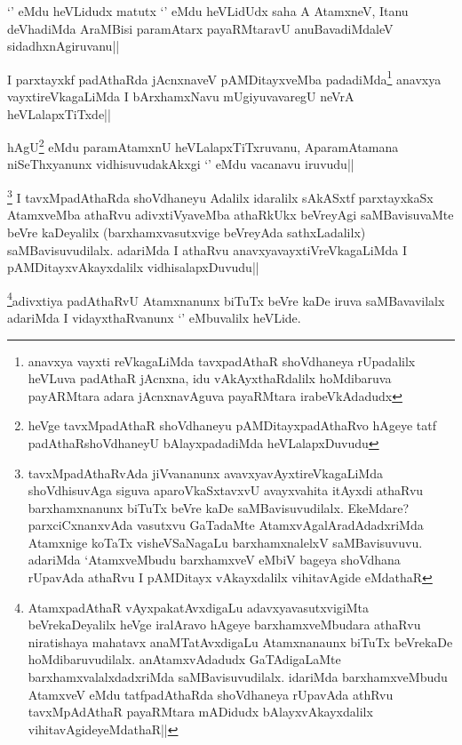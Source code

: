 
\begin{artha}
`\stext ' eMdu heVLidudx matutx `\stext ' eMdu heVLidUdx saha A AtamxneV, Itanu deVhadiMda AraMBisi paramAtarx payaRMtaravU anuBavadiMdaleV sidadhxnAgiruvanu||
\end{artha}


\begin{artha}
I parxtayxkf padAthaRda jAcnxnaveV pAMDitayxveMba padadiMda\footnote[1]{anavxya vayxti reVkagaLiMda tavxpadAthaR shoVdhaneya rUpadalilx heVLuva padAthaR jAcnxna, idu vAkAyxthaRdalilx hoMdibaruva payARMtara adara jAcnxnavAguva payaRMtara irabeVkAdadudx} anavxya vayxtireVkagaLiMda I bArxhamxNavu mUgiyuvavaregU neVrA heVLalapxTiTxde||
\end{artha}

\begin{artha}
hAgU\footnote[2]{heVge tavxMpadAthaR shoVdhaneyu pAMDitayxpadAthaRvo hAgeye tatf padAthaRshoVdhaneyU bAlayxpadadiMda heVLalapxDuvudu} eMdu paramAtamxnU heVLalapxTiTxruvanu, AparamAtamana niSeThxyanunx vidhisuvudakAkxgi `\stext ' eMdu vacanavu iruvudu||
\end{artha}

\begin{artha}%
\footnote[1]{tavxMpadAthaRvAda jiVvananunx avavxyavAyxtireVkagaLiMda shoVdhisuvAga siguva aparoVkaSxtavxvU avayxvahita itAyxdi athaRvu barxhamxnanunx biTuTx beVre kaDe saMBavisuvudilalx. EkeMdare? parxciCxnanxvAda vasutxvu GaTadaMte AtamxvAgalAradAdadxriMda Atamxnige koTaTx visheVSaNagaLu barxhamxnalelxV saMBavisuvuvu. adariMda `AtamxveMbudu barxhamxveV eMbiV bageya shoVdhana rUpavAda athaRvu I pAMDitayx vAkayxdalilx vihitavAgide eMdathaR} I tavxMpadAthaRda shoVdhaneyu Adalilx idaralilx sAkASxtf parxtayxkaSx AtamxveMba athaRvu adivxtiVyaveMba athaRkUkx beVreyAgi saMBavisuvaMte beVre kaDeyalilx (barxhamxvasutxvige beVreyAda sathxLadalilx) saMBavisuvudilalx. adariMda I athaRvu anavxyavayxtiVreVkagaLiMda I pAMDitayxvAkayxdalilx vidhisalapxDuvudu||
\end{artha}


\begin{artha}
\footnote[2]{AtamxpadAthaR vAyxpakatAvxdigaLu adavxyavasutxvigiMta beVrekaDeyalilx heVge iralAravo hAgeye barxhamxveMbudara athaRvu niratishaya mahatavx anaMTatAvxdigaLu Atamxnanaunx biTuTx beVrekaDe hoMdibaruvudilalx. anAtamxvAdadudx GaTAdigaLaMte barxhamxvalalxdadxriMda saMBavisuvudilalx. idariMda barxhamxveMbudu  AtamxveV eMdu tatfpadAthaRda shoVdhaneya rUpavAda athRvu tavxMpAdAthaR payaRMtara mADidudx bAlayxvAkayxdalilx vihitavAgideyeMdathaR||}adivxtiya padAthaRvU Atamxnanunx biTuTx beVre kaDe iruva saMBavavilalx adariMda I vidayxthaRvanunx `\stext ' eMbuvalilx heVLide.
\end{artha}

